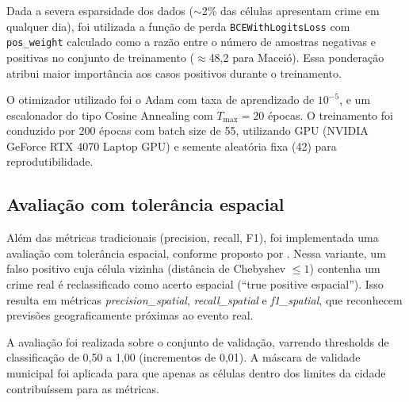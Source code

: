 Dada a severa esparsidade dos dados ($\sim$2\% das células apresentam crime em qualquer dia), foi utilizada a função de perda \texttt{BCEWithLogitsLoss} com \texttt{pos\_weight} calculado como a razão entre o número de amostras negativas e positivas no conjunto de treinamento ($\approx$48,2 para Maceió). Essa ponderação atribui maior importância aos casos positivos durante o treinamento.

O otimizador utilizado foi o Adam com taxa de aprendizado de $10^{-5}$, e um escalonador do tipo Cosine Annealing com $T_{\max} = 20$ épocas. O treinamento foi conduzido por 200 épocas com batch size de 55, utilizando GPU (NVIDIA GeForce RTX 4070 Laptop GPU) e semente aleatória fixa (42) para reprodutibilidade.

\subsection{Avaliação com tolerância espacial}
\label{Sec:avaliacao}

Além das métricas tradicionais (precision, recall, F1), foi implementada uma avaliação com tolerância espacial, conforme proposto por . Nessa variante, um falso positivo cuja célula vizinha (distância de Chebyshev $\leq 1$) contenha um crime real é reclassificado como acerto espacial (``true positive espacial''). Isso resulta em métricas \textit{precision\_spatial}, \textit{recall\_spatial} e \textit{f1\_spatial}, que reconhecem previsões geograficamente próximas ao evento real.

A avaliação foi realizada sobre o conjunto de validação, varrendo thresholds de classificação de 0,50 a 1,00 (incrementos de 0,01). A máscara de validade municipal foi aplicada para que apenas as células dentro dos limites da cidade contribuíssem para as métricas.



